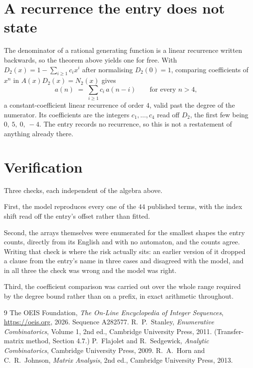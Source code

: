 \documentclass[11pt,a4paper]{article}
\theoremstyle{plain}
\theoremstyle{definition}
\begin{document}
\section{A recurrence the entry does not state}

The denominator of a rational generating function is a linear recurrence written backwards, so
the theorem above yields one for free. With $D_2(x)=1-\sum_{i\ge1}c_ix^i$ after normalising
$D_2(0)=1$, comparing coefficients of $x^n$ in $A(x)D_2(x)=N_2(x)$ gives
\[
a(n)\;=\;\sum_{i\ge1}c_i\,a(n-i)\qquad\text{for every }n>4,
\]
a constant-coefficient linear recurrence of order $4$, valid past the degree of the
numerator. Its coefficients are the integers $c_1,\dots,c_{4}$ read off $D_2$, the first few being $0,\ 5,\ 0,\ -4$. The entry records no recurrence, so this is not a restatement of anything
already there.

\section{Verification}

Three checks, each independent of the algebra above.

First, the model reproduces every one of the $44$ published terms, with the index shift
read off the entry's offset rather than fitted.

Second, the arrays themselves were enumerated for the smallest shapes the entry counts,
directly from its English and with no automaton, and the counts agree. Writing that check is
where the risk actually sits: an earlier version of it dropped a clause from the entry's name
in three cases and disagreed with the model, and in all three the check was wrong and the model
was right.

Third, the coefficient comparison was carried out over the whole range required by the degree
bound rather than on a prefix, in exact arithmetic throughout.

\begin{thebibliography}{9}
 The OEIS Foundation, \emph{The On-Line Encyclopedia of Integer
Sequences}, \url{https://oeis.org}, 2026. Sequence A282577.
 R.~P.~Stanley, \emph{Enumerative Combinatorics}, Volume 1, 2nd ed.,
Cambridge University Press, 2011. (Transfer-matrix method, Section 4.7.)
 P.~Flajolet and R.~Sedgewick, \emph{Analytic Combinatorics}, Cambridge
University Press, 2009.
 R.~A.~Horn and C.~R.~Johnson, \emph{Matrix Analysis}, 2nd ed., Cambridge
University Press, 2013.
\end{thebibliography}
\end{document}
